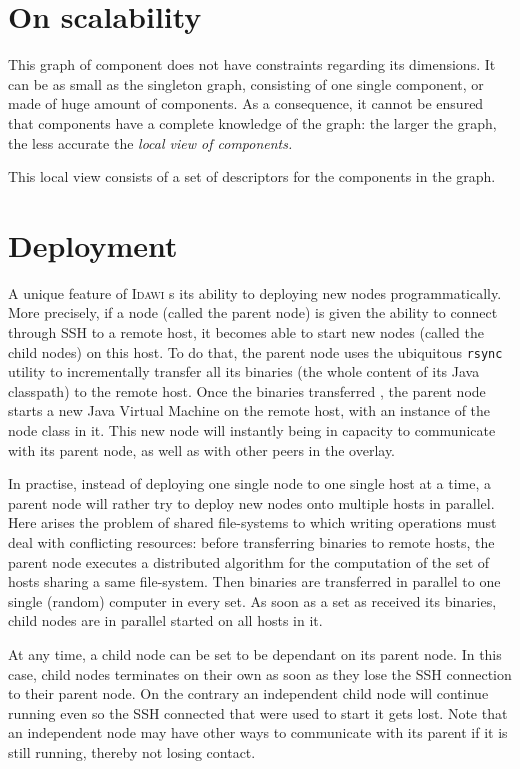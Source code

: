 \documentclass{article}
\newcommand{\idawi}[1]{\textsc{Idawi}\xspace}
\begin{document}
\section{On scalability}
This graph of component does not have constraints regarding its dimensions. It can be as small as the singleton graph, consisting of one single component, or made of huge amount of components.  As a consequence, it cannot be ensured that components have a complete knowledge of the graph: the larger the graph, the less accurate the \em{local view} of components.

This local view consists of a set of descriptors for the components in the graph. 

\section{Deployment}
A unique feature of \idawi is its ability to deploying new nodes programmatically.
More precisely, if a node (called the parent node) is given the ability to connect through SSH to a remote host, it becomes able to start new nodes (called the child nodes) on this host.
To do that, the parent node uses the ubiquitous \texttt{rsync} utility to incrementally transfer all its binaries (the whole content of its Java classpath) to the remote host. Once the binaries transferred , the parent node starts a new Java Virtual Machine on the remote host, with an instance of the node class in it. This new node will instantly being in capacity to communicate with its parent node, as well as with other peers in the overlay.

In practise, instead of deploying one single node to one single host at a time, a parent node will rather try to deploy new nodes onto multiple hosts in parallel. Here arises the problem of shared file-systems to which writing operations must deal with  conflicting resources: before transferring binaries to remote hosts, the parent node executes a distributed algorithm for the computation of the set of hosts sharing a same file-system. Then binaries are transferred in parallel to one single (random) computer in every set. As soon as a set as received its binaries, child nodes are in parallel  started on all hosts in it.

At any time, a child node can be set to be dependant on its parent node. In this case, child nodes terminates on their own as soon as they lose the SSH connection to their parent node. On the contrary an independent child node will continue running even so the SSH connected that were used to start it gets lost. Note that an independent node may have other ways to communicate with its parent if it is still running, thereby not losing contact.
\end{document}
